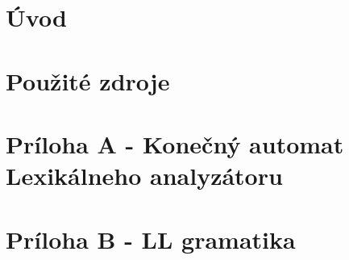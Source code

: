 \documentclass[a4paper, 11pt]{article}
\begin{document}
\tableofcontents
\newpage

\section{Úvod}
\newpage

\section{Použité zdroje}
\newpage

\section{Príloha A - Konečný automat Lexikálneho analyzátoru}
\newpage

\section{Príloha B - LL gramatika}
\newpage
\end{document}
